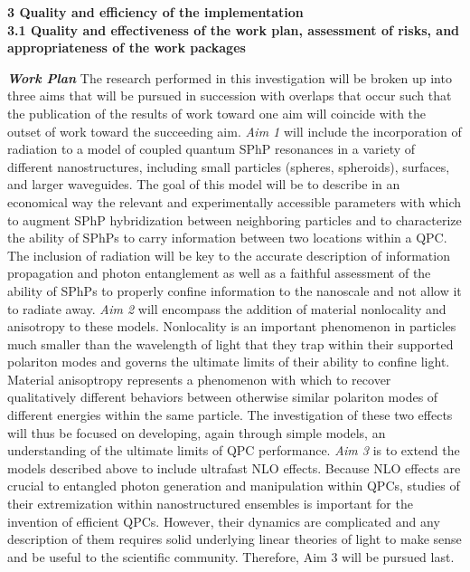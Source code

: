 \documentclass[11pt,a4paper]{article}
\begin{document}

\noindent\textbf{3 Quality and efficiency of the implementation}\\
\noindent\textbf{3.1 Quality and effectiveness of the work plan, assessment of risks, and appropriateness of the work packages}

\textbf{\textit{Work Plan}} The research performed in this investigation will be broken up into three aims that will be pursued in succession with overlaps that occur such that the publication of the results of work toward one aim will coincide with the outset of work toward the succeeding aim. \textit{Aim 1} will include the incorporation of radiation to a model of coupled quantum SPhP resonances in a variety of different nanostructures, including small particles (spheres, spheroids), surfaces, and larger waveguides. The goal of this model will be to describe in an economical way the relevant and experimentally accessible parameters with which to augment SPhP hybridization between neighboring particles and to characterize the ability of SPhPs to carry information between two locations within a QPC. The inclusion of radiation will be key to the accurate description of information propagation and photon entanglement as well as a faithful assessment of the ability of SPhPs to properly confine information to the nanoscale and not allow it to radiate away. \textit{Aim 2} will encompass the addition of material nonlocality and anisotropy to these models. Nonlocality is an important phenomenon in particles much smaller than the wavelength of light that they trap within their supported polariton modes and governs the ultimate limits of their ability to confine light. Material anisoptropy represents a phenomenon with which to recover qualitatively different behaviors between otherwise similar polariton modes of different energies within the same particle. The investigation of these two effects will thus be focused on developing, again through simple models, an understanding of the ultimate limits of QPC performance. \textit{Aim 3} is to extend the models described above to include ultrafast NLO effects. Because NLO effects are crucial to entangled photon generation and manipulation within QPCs, studies of their extremization within nanostructured ensembles is important for the invention of efficient QPCs. However, their dynamics are complicated and any description of them requires solid underlying linear theories of light to make sense and be useful to the scientific community. Therefore, Aim 3 will be pursued last.
\end{document}
